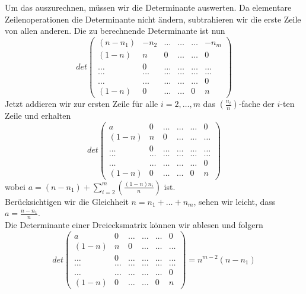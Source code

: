 Um das auszurechnen, müssen wir die Determinante auswerten. 
Da elementare Zeilenoperationen die Determinante nicht ändern, subtrahieren wir die erste Zeile von allen anderen. Die zu berechnende Determinante ist nun
\begin{equation}
det
\begin{pmatrix}
 (n-n_1)&-n_2&\ldots&\ldots&\ldots&-n_m\\
 (1-n)&n&0&\ldots&\ldots&0\\
 \ldots&0&\ldots&\ldots&\ldots&\ldots\\
 \ldots&\ldots&\ldots&\ldots&\ldots&\ldots\\
 \ldots&\ldots&\ldots&\ldots&\ldots&0\\
 (1-n)&0&\ldots&\ldots&0&n
\end{pmatrix}
\end{equation}
Jetzt addieren wir zur ersten Zeile für alle $i=2,\ldots,m$ das $\left(\frac{n_i}{n}\right)$-fache der $i$-ten Zeile und erhalten
\begin{equation}
det
\begin{pmatrix}
 a&0&\ldots&\ldots&\ldots&0\\
 (1-n)&n&0&\ldots&\ldots&\ldots\\
 \ldots&0&\ldots&\ldots&\ldots&\ldots\\
 \ldots&\ldots&\ldots&\ldots&\ldots&\ldots\\
 \ldots&\ldots&\ldots&\ldots&\ldots&0\\
 (1-n)&0&\ldots&\ldots&0&n
\end{pmatrix}
\end{equation}
wobei $a = (n-n_1)+\sum_{i=2}^m\left(\frac{(1-n)n_i}{n}\right)$ ist.\\
Berücksichtigen wir die Gleichheit $n=n_1+\ldots+n_m$, sehen wir leicht, dass $a=\frac{n-n_1}{n}$.\\
Die Determinante einer Dreiecksmatrix können wir ablesen und folgern
\begin{equation}
det
\begin{pmatrix}
 a&0&\ldots&\ldots&\ldots&0\\
 (1-n)&n&0&\ldots&\ldots&\ldots\\
 \ldots&0&\ldots&\ldots&\ldots&\ldots\\
 \ldots&\ldots&\ldots&\ldots&\ldots&\ldots\\
 \ldots&\ldots&\ldots&\ldots&\ldots&0\\
 (1-n)&0&\ldots&\ldots&0&n
\end{pmatrix}
= n^{m-2}(n-n_1)
\end{equation}
